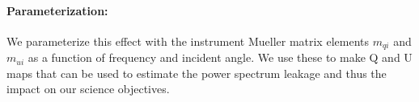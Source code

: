\paragraph{Parameterization:}
We parameterize this effect with the instrument Mueller matrix elements $m_{qi}$ and $m_{ui}$ as a function of frequency and incident angle. We use these to make Q and U maps that can be used to estimate the power spectrum leakage and thus the impact on our science objectives.
